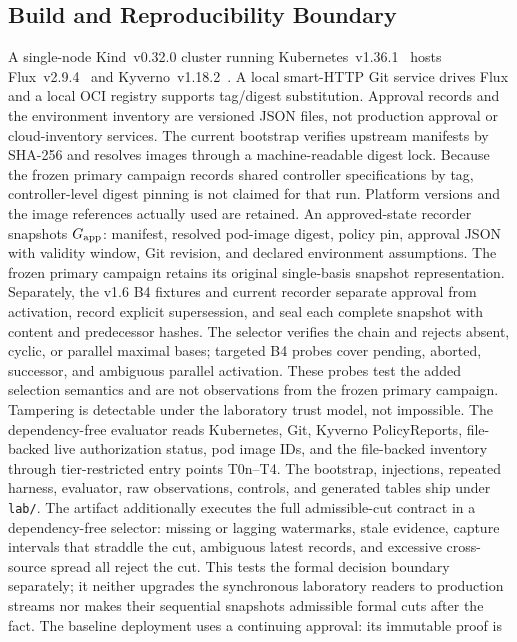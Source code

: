 \subsection{Build and Reproducibility Boundary}
A single-node Kind~v0.32.0 cluster running Kubernetes~v1.36.1~\cite{kind}
hosts Flux~v2.9.4~\cite{fluxcd} and Kyverno~v1.18.2~\cite{kyverno}. A local
smart-HTTP Git service drives Flux and a local OCI registry supports
tag/digest substitution. Approval records and the environment inventory are
versioned JSON files, not production approval or cloud-inventory services.
The current bootstrap verifies upstream manifests by SHA-256 and resolves
images through a machine-readable digest lock. Because the frozen primary
campaign records shared controller specifications by tag, controller-level
digest pinning is not claimed for that run. Platform versions and the image
references actually used are retained. An approved-state recorder snapshots
$G_{\mathrm{app}}$: manifest, resolved pod-image digest, policy pin, approval JSON with
validity window, Git revision, and declared environment assumptions. The
frozen primary campaign retains its original single-basis snapshot
representation. Separately, the v1.6 B4 fixtures and current recorder separate
approval from activation, record explicit supersession, and seal each complete
snapshot with content and predecessor hashes. The selector verifies the chain
and rejects absent, cyclic, or parallel maximal bases; targeted B4 probes cover
pending, aborted, successor, and ambiguous parallel activation. These probes
test the added selection semantics and are not observations from the frozen
primary campaign. Tampering is detectable under the laboratory trust model,
not impossible. The
dependency-free evaluator reads Kubernetes, Git, Kyverno PolicyReports,
file-backed live authorization status, pod image IDs, and the file-backed inventory through
tier-restricted entry points T0n--T4. The bootstrap, injections, repeated
harness, evaluator, raw observations, controls, and generated tables ship
under \texttt{lab/}.
The artifact additionally executes the full admissible-cut contract in a
dependency-free selector: missing or lagging watermarks, stale evidence,
capture intervals that straddle the cut, ambiguous latest records, and
excessive cross-source spread all reject the cut. This tests the formal
decision boundary separately; it neither upgrades the synchronous laboratory
readers to production streams nor makes their sequential snapshots admissible
formal cuts after the fact.
The baseline deployment uses a continuing approval: its immutable proof is

